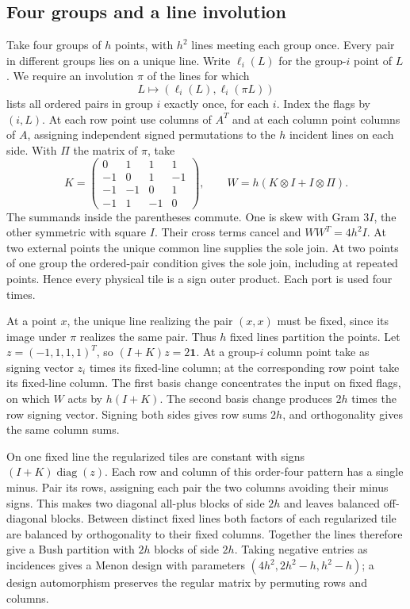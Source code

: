 \documentclass[11pt,reqno]{amsart}
\theoremstyle{remark}\newtheorem{remark}[theorem]{Remark}
\newcommand{\one}{\mathbf 1}
\begin{document}
\subsection{Four groups and a line involution}
Take four groups of \(h\) points, with \(h^2\) lines meeting each group once. Every pair in different groups lies on a unique line. Write \(\ell_i(L)\) for the group-\(i\) point of \(L\). We require an involution \(\pi\) of the lines for which
\[
 L\longmapsto(\ell_i(L),\ell_i(\pi L))
\]
lists all ordered pairs in group \(i\) exactly once, for each \(i\). Index the flags by \((i,L)\). At each row point use columns of \(A^T\) and at each column point columns of \(A\), assigning independent signed permutations to the \(h\) incident lines on each side. With \(\Pi\) the matrix of \(\pi\), take
\[
 K=\begin{pmatrix}0&1&1&1\\-1&0&1&-1\\-1&-1&0&1\\-1&1&-1&0\end{pmatrix},
 \qquad W=h(K\otimes I+I\otimes\Pi).
\]
The summands inside the parentheses commute. One is skew with Gram \(3I\), the other symmetric with square \(I\). Their cross terms cancel and \(WW^T=4h^2I\). At two external points the unique common line supplies the sole join. At two points of one group the ordered-pair condition gives the sole join, including at repeated points. Hence every physical tile is a sign outer product. Each port is used four times.

At a point \(x\), the unique line realizing the pair \((x,x)\) must be fixed, since its image under \(\pi\) realizes the same pair. Thus \(h\) fixed lines partition the points. Let \(z=(-1,1,1,1)^T\), so \((I+K)z=2\one\). At a group-\(i\) column point take as signing vector \(z_i\) times its fixed-line column; at the corresponding row point take its fixed-line column. The first basis change concentrates the input on fixed flags, on which \(W\) acts by \(h(I+K)\). The second basis change produces \(2h\) times the row signing vector. Signing both sides gives row sums \(2h\), and orthogonality gives the same column sums.

On one fixed line the regularized tiles are constant with signs \((I+K)\operatorname{diag}(z)\). Each row and column of this order-four pattern has a single minus. Pair its rows, assigning each pair the two columns avoiding their minus signs. This makes two diagonal all-plus blocks of side \(2h\) and leaves balanced off-diagonal blocks. Between distinct fixed lines both factors of each regularized tile are balanced by orthogonality to their fixed columns. Together the lines therefore give a Bush partition with \(2h\) blocks of side \(2h\). Taking negative entries as incidences gives a Menon design with parameters \((4h^2,2h^2-h,h^2-h)\); a design automorphism preserves the regular matrix by permuting rows and columns.
\end{document}
